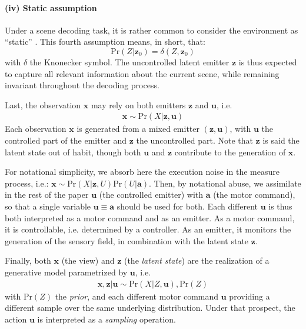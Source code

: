 \documentclass[12pt,twoside,openright]{article}
\begin{document}
\paragraph{(iv) Static assumption}
Under a scene decoding  task, 
it is rather common to consider the environment as ``static'' \citep{butko2010infomax}. This fourth assumption means, in short, that:
$$\text{Pr}(Z|\boldsymbol{z}_0) = \delta(Z, \boldsymbol{z}_0)$$ 
with $\delta$ the Knonecker symbol. 
The uncontrolled latent emitter $\boldsymbol{z}$ is thus expected to capture all relevant information about the current scene, while remaining invariant throughout the decoding process.


Last, the {\color{Purple}observation} $\boldsymbol{x}$ may rely on both emitters $\boldsymbol{z}$ and $\boldsymbol{u}$, i.e. 
\begin{align}
\boldsymbol{x} \sim \text{Pr}(X|\boldsymbol{z}, \boldsymbol{u})
\label{eq:gen}
\end{align} 
Each {\color{Purple}observation} $\boldsymbol{x}$ is generated from a mixed emitter $(\boldsymbol{z}, \boldsymbol{u})$, with $\boldsymbol{u}$ the controlled part of the emitter and  $\boldsymbol{z}$ the uncontrolled part. Note that $\boldsymbol{z}$ is said the latent state out of habit, though both $\boldsymbol{u}$ and $\boldsymbol{z}$ contribute to the generation of $\boldsymbol{x}$.

For notational simplicity, we absorb here the execution noise \citep{van2004role} in the measure process, i.e.:
$\boldsymbol{x} \sim \text{Pr}(X|\boldsymbol{z}, U)\text{Pr}(U|\boldsymbol{a})$.
Then, by notational abuse, we assimilate in the rest of the paper  $\boldsymbol{u}$ (the controlled emitter) with $\boldsymbol{a}$ (the motor command), so that 
a single variable $\boldsymbol{u} \equiv \boldsymbol{a}$ should be used for both. 
Each different $\boldsymbol{u}$ is thus both interpreted as a
motor command and as {\color{Purple} an emitter}. As a motor command, it is controllable, i.e. determined by a controller. As {\color{Purple} an emitter}, it monitors the generation of the sensory field, in combination with the latent state $\boldsymbol{z}$. 

Finally, both $\boldsymbol{x}$ (the view) and $\boldsymbol{z}$ (the \emph{latent state}) are the realization of a generative model parametrized by $\boldsymbol{u}$, i.e.
\begin{align}
\boldsymbol{x}, \boldsymbol{z} | \boldsymbol{u} \sim \text{Pr}(X|Z, \boldsymbol{u}), \text{Pr}(Z) \label{eq:generative}
\end{align}  
with $\text{Pr}(Z)$ the \emph{prior}, and each different motor command $\boldsymbol{u}$ providing a different sample over the same underlying distribution. Under that prospect, the action $\boldsymbol{u}$ is interpreted as a \emph{sampling} operation.
\end{document}

